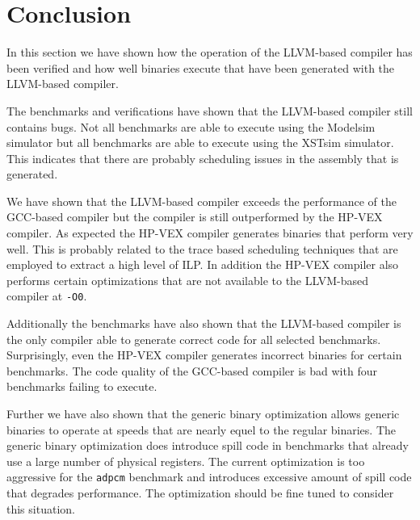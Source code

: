 \section{Conclusion}
In this section we have shown how the operation of the LLVM-based compiler has been verified and how well binaries execute that have been generated with the LLVM-based compiler.

The benchmarks and verifications have shown that the LLVM-based compiler still contains bugs. Not all benchmarks are able to execute using the Modelsim simulator but all benchmarks are able to execute using the XSTsim simulator. This indicates that there are probably scheduling issues in the assembly that is generated.

We have shown that the LLVM-based compiler exceeds the performance of the GCC-based compiler but the compiler is still outperformed by the HP-VEX compiler. As expected the HP-VEX compiler generates binaries that perform very well. This is probably related to the trace based scheduling techniques that are employed to extract a high level of ILP. In addition the HP-VEX compiler also performs certain optimizations that are not available to the LLVM-based compiler at \texttt{-O0}.

Additionally the benchmarks have also shown that the LLVM-based compiler is the only compiler able to generate correct code for all selected benchmarks. Surprisingly, even the HP-VEX compiler generates incorrect binaries for certain benchmarks. The code quality of the GCC-based compiler is bad with four benchmarks failing to execute.

Further we have also shown that the generic binary optimization allows generic binaries to operate at speeds that are nearly equel to the regular binaries. The generic binary optimization does introduce spill code in benchmarks that already use a large number of physical registers. The current optimization is too aggressive for the \texttt{adpcm} benchmark and introduces excessive amount of spill code that degrades performance. The optimization should be fine tuned to consider this situation.
\acresetall
